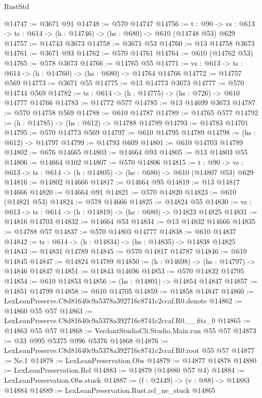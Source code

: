 \begin{lexlean}{RustStd}
\begin{coremodule}
@14747 := @3671 @91
@14748 := @570 @14747
@14756 := {t : @90} ->
  {vs : @613} -> {ts : @614} -> (h : @14746) -> (hs : @680) -> @610 (@14748 @53) @629
@14757 := @14743 @3673
@14758 := @3671 @53
@14760 := @13 @14758 @3673
@14761 := @3671 @93
@14762 := @570 @14761
@14764 := @610 (@14762 @53)
@14765 := @578 @3673
@14766 := @14765 @55
@14771 := {vs : @613} -> {ts : @614} -> (h : @14760) -> (hs : @680) -> @14764 @14766
@14772 := @14757 @569
@14773 := @3671 @55
@14775 := @13 @14773 @3673
@14777 := @570 @14744 @569
@14782 := {ts : @614} -> (h : @14775) -> (hs : @726) -> @610 @14777 @14766
@14783 := @14772 @577
@14785 := @13 @14699 @3673
@14787 := @570 @14758 @569
@14788 := @610 @14787
@14789 := @14765 @577
@14792 := (h : @14785) -> (hs : @612) -> @14788 @14789
@14793 := @14783 @14701
@14795 := @570 @14773 @569
@14797 := @610 @14795 @14789
@14798 := (hs : @612) -> @14797
@14799 := @14793 @609
@14801 := @610 @14703 @14789
@14802 := @676 @14665
@14803 := @14664 @93
@14805 := @13 @14803 @55
@14806 := @14664 @102
@14807 := @570 @14806
@14815 := {t : @90} ->
  {vs : @613} -> {ts : @614} -> (h : @14805) -> (hs : @680) -> @610 (@14807 @53) @629
@14816 := @14802 @14666
@14817 := @14664 @95
@14819 := @13 @14817 @14666
@14820 := @14664 @91
@14821 := @570 @14820
@14823 := @610 (@14821 @53)
@14824 := @578 @14666
@14825 := @14824 @55
@14830 := {vs : @613} -> {ts : @614} -> (h : @14819) -> (hs : @680) -> @14823 @14825
@14831 := @14816 @14703
@14832 := @14664 @53
@14834 := @13 @14832 @14666
@14835 := @14788 @57
@14837 := @570 @14803 @14777
@14838 := @610 @14837
@14842 := {ts : @614} -> (h : @14834) -> (hs : @14835) -> @14838 @14825
@14843 := @14831 @14789
@14845 := @570 @14817 @14787
@14846 := @610 @14845
@14847 := @14824 @14789
@14850 := (h : @14698) -> (hs : @14797) -> @14846 @14847
@14851 := @14843 @14696
@14853 := @570 @14832 @14795
@14854 := @610 @14853
@14856 := (hs : @14801) -> @14854 @14847
@14857 := @14851 @14799
@14858 := @610 @14705
@14859 := @14858 @14847
@14860 := LexLeanPreserve.C8d81640c9a5378a392716c8741c2ccaf.R0.denote
@14862 := @14860 @55 @57
@14863 := LexLeanPreserve.C8d81640c9a5378a392716c8741c2ccaf.R0.__fits_0
@14865 := @14863 @55 @57
@14868 := VerdantStudioCli.Studio.Main.run @55 @57
@14873 := @33 @995 @5375 @996 @5376 @14868
@14876 := LexLeanPreserve.C8d81640c9a5378a392716c8741c2ccaf.R0.root @55 @57
@14877 := Ne.{1}
@14878 := LexLeanPreservation.Obs
@14879 := @14877 @14878
@14880 := LexLeanPreservation.Rel
@14883 := @14879 (@14880 @57 @4)
@14884 := LexLeanPreservation.Obs.stuck
@14887 := (f : @2449) -> (v : @88) -> @14883 @14884
@14889 := LexLeanPreservation.Rust.rel_ne_stuck @14865

\end{coremodule}
\end{lexlean}
